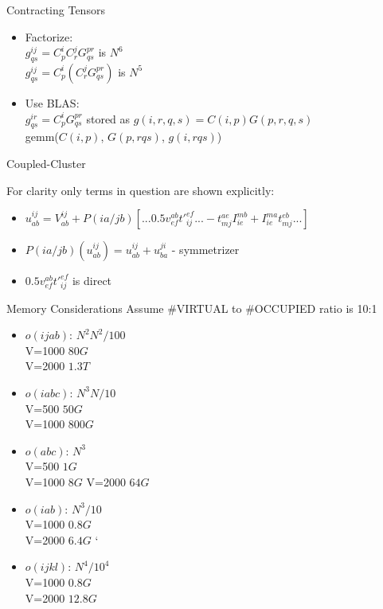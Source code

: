 \documentclass{beamer}
\begin{document}
\begin{frame}{Contracting Tensors}
\begin{itemize}
  \item Factorize: \\
    $g^{ij}_{qs} = C^i_p C^j_r G^{pr}_{qs}$ is $N^6$ \\
    $g^{ij}_{qs} = C^i_p (C^j_r G^{pr}_{qs})$ is $N^5$
  \item Use BLAS: \\
  $g^{ir}_{qs} = C^i_p G^{pr}_{qs}$ stored as
  $g(i,r,q,s) = C(i,p) G(p,r,q,s)$ \\
  gemm($C(i,p)$, $G(p,rqs)$, $g(i,rqs)$)
\end{itemize}
\end{frame}

\begin{frame}{Coupled-Cluster}

For clarity only terms in question are shown explicitly:

\begin{itemize}
\item $u^{ij}_{ab} = V^{ij}_{ab} + P(ia/jb)[ ...
    0.5 v^{ab}_{ef} t'^{ef}_{ij} ...
- t^{ae}_{mj} I^{mb}_{ie} + I^{ma}_{ie} t^{eb}_{mj} ... ]$
\item  $P(ia/jb)(u^{ij}_{ab}) = u^{ij}_{ab} + u^{ji}_{ba}$ - symmetrizer \\
  \item $0.5 v^{ab}_{ef} t'^{ef}_{ij}$ is direct
\end{itemize}

\end{frame}

\begin{frame}{Memory Considerations}
  Assume \#VIRTUAL to \#OCCUPIED ratio is 10:1
  \begin{itemize}
  \item $o(ijab)$: $N^2 N^2/100$ \\
    V=1000 $80G$ \\
    V=2000 $1.3T$
  \item $o(iabc)$: $N^3 N/10$ \\
    V=500 $50G$ \\
    V=1000 $800G$
  \item $o(abc)$: $N^3$ \\
    V=500 $1G$ \\
    V=1000 $8G$
    V=2000 $64G$
  \item $o(iab)$: $N^3/10$ \\
    V=1000 $0.8G$ \\
    V=2000 $6.4G$
`\item $o(ijkl)$: $N^4/10^4$ \\
    V=1000 $0.8G$ \\
    V=2000 $12.8G$
  \end{itemize}
\end{frame}
\end{document}
